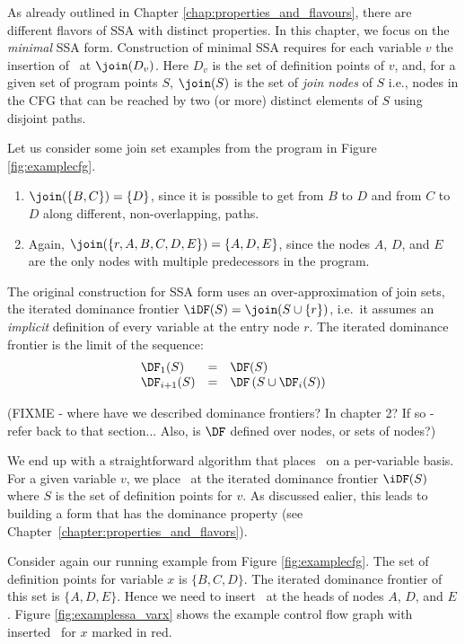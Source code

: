 As already outlined in Chapter \ref{chap:properties_and_flavours},
there are different flavors of SSA with distinct properties.
In this chapter, we focus on the \textit{minimal} SSA form.
Construction of minimal SSA 
requires for each variable $v$ the insertion of \phiops\ at $\join(D_v)$.
Here $D_v$ is the set of definition points of $v$, and,
for a given set of program points $S$, $\join(S)$ is the set of
\textit{join nodes} of $S$
i.e., nodes in the CFG that can be reached by
two (or more) distinct elements of $S$ using disjoint paths.

Let us consider some join set examples from the
program in Figure \ref{fig:examplecfg}.
\begin{enumerate}
\item $\join(\{B,C\}) = \{D\}$, since it is possible to get from $B$ to $D$
and from $C$ to $D$ along different, non-overlapping, paths.
\item Again, $\join(\{r, A, B, C, D, E \}) = \{A,D,E\}$, since the nodes
$A$, $D$, and $E$ are the only nodes with multiple predecessors in
the program.
\end{enumerate}

 
The original construction for SSA form uses an over-approximation of
join sets, the iterated dominance frontier $\iDF(S)=\join(S\cup
\{r\})$, i.e.\ it assumes an \emph{implicit} definition of every
variable at the entry node $r$.
The iterated dominance frontier is the limit of the sequence:
$$\begin{array}{lll}
\DF_1(S) & = & \DF(S)\\
\DF_{i+1}(S) & = & \DF\left(S\cup \DF_i(S)\right)
\end{array}$$

(FIXME - where have we described dominance frontiers? In chapter 2?
If so - refer back to that section...
Also, is $\DF$ defined over nodes, or sets of nodes?)

We end up with a straightforward algorithm that places \phiops\
on a per-variable basis.
For a given variable $v$, we place \phiops\ at the
iterated dominance frontier $\iDF(S)$ where
$S$ is the set of definition points for $v$.
As discussed ealier, this leads to building a form that has
the dominance property (see Chapter~\ref{chapter:properties_and_flavors}).

Consider again our running example from Figure 
\ref{fig:examplecfg}. The set of definition points for variable
$x$ is $\{ B,C,D \}$. The iterated dominance frontier of this set
is $\{ A, D, E \}$. Hence we need to insert 
\phiops\ at the heads of nodes $A$, $D$, and $E$.
Figure \ref{fig:examplessa_varx} shows the example control flow graph
with inserted \phiops\ for $x$ marked in red.


